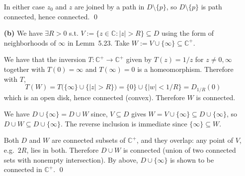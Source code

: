 \documentclass[a4paper]{article}
\begin{document}
\begin{enumerate}
    In either case $z_0$ and $z$ are joined by a path in $D\setminus\{p\}$, so $D\setminus\{p\}$ is path connected, hence connected. \qed
    
    \item[\textbf{(b)}] We have $\exists R>0$ s.t. $V:=\{z\in\mathbb{C}:|z|>R\}\subseteq D$ using the form of neighborhoods of $\infty$ in Lemm~5.23. Take $W:=V\cup\{\infty\}\subseteq\mathbb{C}^{+}$.

    \medskip
    We have that the inversion $T:\mathbb{C}^{+}\to\mathbb{C}^{+}$ given by $T(z)=1/z$ for $z\ne 0,\infty$ together with $T(0)=\infty$ and $T(\infty)=0$ is a homeomorphism. Therefore with $T$,
    \[
        T(W)=T\bigl(\{\infty\}\cup\{|z|>R\}\bigr)=\{0\}\cup\{|w|<1/R\}=D_{1/R}(0)
    \]
    which is an open disk, hence connected (convex). Therefore $W$ is connected.

    \medskip
    We have $D\cup\{\infty\}=D\cup W$ since, $V\subseteq D$ gives $W=V\cup\{\infty\}\subseteq D\cup\{\infty\}$, so $D\cup W\subseteq D\cup\{\infty\}$. The reverse inclusion is immediate since $\{\infty\}\subseteq W$.
    
    Both $D$ and $W$ are connected subsets of $\mathbb{C}^{+}$, and they overlap: any point of $V$, e.g.\ $2R$, lies in both. Therefore $D\cup W$ is connected (union of two connected sets with nonempty intersection). By above, $D\cup\{\infty\}$ is shown to be connected in $\mathbb{C}^{+}$. \qed
\end{enumerate}
\end{document}
